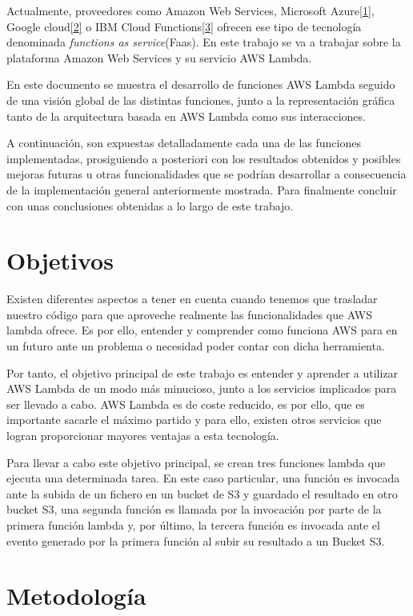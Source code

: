 \documentclass[
]{article}
\begin{document}
Actualmente, proveedores como Amazon Web Services, Microsoft
Azure\protect\hyperlink{1}{{[}1{]}}, Google
cloud\protect\hyperlink{1}{{[}2{]}} o IBM Cloud
Functions\protect\hyperlink{1}{{[}3{]}} ofrecen ese tipo de tecnología
denominada \emph{functions as service}(Faas). En este trabajo se va a
trabajar sobre la plataforma Amazon Web Services y su servicio AWS
Lambda.

En este documento se muestra el desarrollo de funciones AWS Lambda
seguido de una visión global de las distintas funciones, junto a la
representación gráfica tanto de la arquitectura basada en AWS Lambda
como sus interacciones.

A continuación, son expuestas detalladamente cada una de las funciones
implementadas, prosiguiendo a posteriori con los resultados obtenidos y
posibles mejoras futuras u otras funcionalidades
que se podrían desarrollar a consecuencia de la implementación general
anteriormente mostrada. Para finalmente concluir con unas conclusiones
obtenidas a lo largo de este trabajo.
\newpage
\hypertarget{header-n9}{%
\section{Objetivos}\label{header-n9}}

Existen diferentes aspectos a tener en cuenta cuando tenemos que
trasladar nuestro código para que aproveche realmente las
funcionalidades que AWS lambda ofrece. Es por ello, entender y
comprender como funciona AWS para en un futuro ante un problema o
necesidad poder contar con dicha herramienta.

Por tanto, el objetivo principal de este trabajo es entender y aprender
a utilizar AWS Lambda de un modo más minucioso, junto a los servicios
implicados para ser llevado a cabo. AWS Lambda es de coste reducido, es
por ello, que es importante sacarle el máximo partido y para ello,
existen otros servicios que logran proporcionar mayores ventajas a esta
tecnología.

Para llevar a cabo este objetivo principal, se crean tres funciones
lambda que ejecuta una determinada tarea. En este caso particular, una
función es invocada ante la subida de un fichero en un bucket de S3 y
guardado el resultado en otro bucket S3, una segunda función es llamada
por la invocación por parte de la primera función lambda y, por último,
la tercera función es invocada ante el evento generado por la primera
función al subir su resultado a un Bucket S3.

\hypertarget{header-n14}{%
\section{Metodología}\label{header-n14}}
\end{document}
